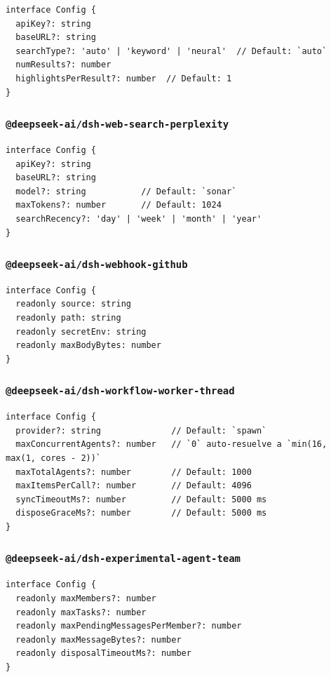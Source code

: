 \documentclass[11pt,a4paper]{article}
\begin{document}
\begin{lstlisting}
interface Config {
  apiKey?: string
  baseURL?: string
  searchType?: 'auto' | 'keyword' | 'neural'  // Default: `auto`
  numResults?: number
  highlightsPerResult?: number  // Default: 1
}
\end{lstlisting}


\subsubsection*{\texttt{@deepseek-ai/dsh-web-search-perplexity}}


\begin{lstlisting}
interface Config {
  apiKey?: string
  baseURL?: string
  model?: string           // Default: `sonar`
  maxTokens?: number       // Default: 1024
  searchRecency?: 'day' | 'week' | 'month' | 'year'
}
\end{lstlisting}


\subsubsection*{\texttt{@deepseek-ai/dsh-webhook-github}}


\begin{lstlisting}
interface Config {
  readonly source: string
  readonly path: string
  readonly secretEnv: string
  readonly maxBodyBytes: number
}
\end{lstlisting}


\subsubsection*{\texttt{@deepseek-ai/dsh-workflow-worker-thread}}


\begin{lstlisting}
interface Config {
  provider?: string              // Default: `spawn`
  maxConcurrentAgents?: number   // `0` auto-resuelve a `min(16, max(1, cores - 2))`
  maxTotalAgents?: number        // Default: 1000
  maxItemsPerCall?: number       // Default: 4096
  syncTimeoutMs?: number         // Default: 5000 ms
  disposeGraceMs?: number        // Default: 5000 ms
}
\end{lstlisting}


\subsubsection*{\texttt{@deepseek-ai/dsh-experimental-agent-team}}


\begin{lstlisting}
interface Config {
  readonly maxMembers?: number
  readonly maxTasks?: number
  readonly maxPendingMessagesPerMember?: number
  readonly maxMessageBytes?: number
  readonly disposalTimeoutMs?: number
}
\end{lstlisting}
\end{document}
